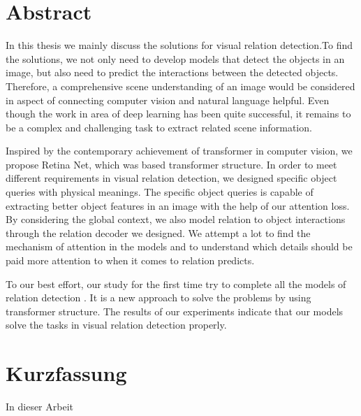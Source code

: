 \chapter*{Abstract}
\label{chap:Abstract}
\setcounter{page}{1}
In this thesis we mainly discuss  the solutions for visual relation detection.To find the solutions, we not only need to  develop models that detect the objects in an image, but also need to predict the interactions between the detected objects. Therefore, a comprehensive scene understanding of an image would be considered in aspect of connecting computer vision and natural language  helpful. Even though the work in area of deep learning has been quite successful, it remains to be a complex and challenging task to extract related scene information. 

 Inspired by the contemporary achievement of transformer in computer vision, we propose Retina Net, which was based transformer structure. In order to meet different requirements in visual relation detection, we designed specific object queries with physical meanings. The specific object queries is capable of extracting better object features in an image with the help of our attention loss.  By considering the global context, we also model relation to object interactions through the relation decoder we designed. We attempt a lot to find the mechanism of attention in the models and to understand which details should be paid more attention to when it comes to relation predicts.
 
 To our best effort, our study for the first time try to complete all the models of relation detection . It is a new approach to solve the problems by using transformer structure. The results of our experiments indicate that our models solve the tasks in visual relation detection properly.


\chapter*{Kurzfassung}


\label{chap:Kurzfassung}

In dieser Arbeit 